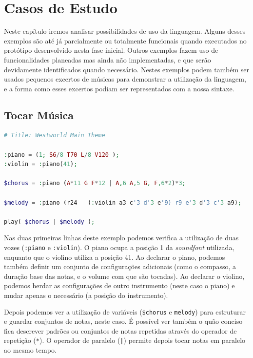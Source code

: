 \chapter{Casos de Estudo}
Neste capítulo iremos analisar possibilidades de uso da linguagem. Alguns desses exemplos são até já parcialmente ou totalmente funcionais quando executados no protótipo desenvolvido nesta fase inicial. Outros exemplos fazem uso de funcionalidades planeadas mas ainda não implementadas, e que serão devidamente identificados quando necessário.
Nestes exemplos podem também ser usados pequenos excertos de músicas para demonstrar a utilização da linguagem, e a forma como esses excertos podiam ser representados com a nossa sintaxe.

\section{Tocar Música}
\begin{lstlisting}[caption=Exemplo da sintaxe para criação de música,language=PHP]
# Title: Westworld Main Theme

:piano = (1; S6/8 T70 L/8 V120 );
:violin = :piano(41);

$chorus = :piano (A*11 G F*12 | A,6 A,5 G, F,6*2)*3;

$melody = :piano (r24   (:violin a3 c'3 d'3 e'9) r9 e'3 d'3 c'3 a9);

play( $chorus | $melody );
\end{lstlisting}


Nas duas primeiras linhas deste exemplo podemos verifica a utilização de duas vozes (\texttt{:piano} e \texttt{:violin}). O piano ocupa a posição 1 da \textit{soundfont} utilizada, enquanto que o violino utiliza a posição 41. Ao declarar o piano, podemos também definir um conjunto de configurações adicionais (como o compasso, a duração base das notas, e o volume com que são tocadas). Ao declarar o violino, podemos herdar as configurações de outro instrumento (neste caso o piano) e mudar apenas o necessário (a posição do instrumento).

Depois podemos ver a utilização de variáveis (\texttt{\$chorus} e \texttt{melody}) para estruturar e guardar conjuntos de notas, neste caso.
É possível ver também o quão conciso fica descrever padrões ou conjuntos de notas repetidas através do operador de repetição (\texttt{*}). O operador de paralelo (\texttt{|}) permite depois tocar notas em paralelo ao mesmo tempo.


